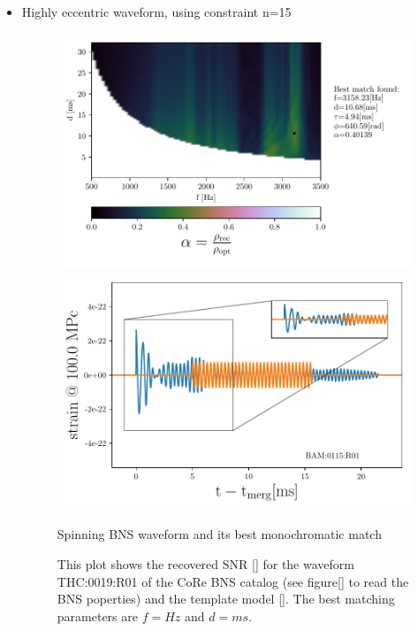 \begin{itemize}[leftmargin=*]
\FloatBarrier


\item Highly eccentric waveform, using constraint n=15

\begin{figure}[!htbp]
\begin{center}
\begin{minipage}[t]{0.5\linewidth}
\vspace{0pt}
\includegraphics[scale=0.6,trim={2mm 0 35mm 0},clip]{images/Data_analysis/results/2D_grid_15.pdf}
\end{minipage}%
\begin{minipage}[t]{0.5\linewidth}
\vspace{20pt}
\includegraphics[scale=0.45]{images/Data_analysis/results/2D_grid_16.pdf}
\end{minipage}
\captionsetup{width=0.8\textwidth}
\caption{Spinning BNS waveform and its best monochromatic match}
\caption*{This plot shows the recovered SNR \ref{} for the waveform THC:0019:R01 of the CoRe BNS catalog \cite{}(see figure\ref{} to read the BNS poperties) and the template model \ref{}. The best matching parameters are $f=Hz$ and $d=ms$.}
\end{center}
\end{figure}

\FloatBarrier

\end{itemize}


